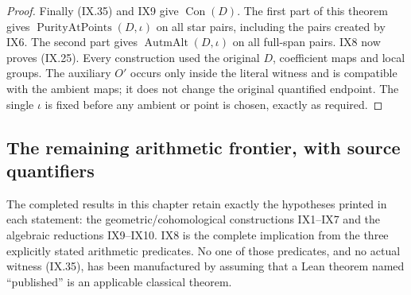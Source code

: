 \begin{proof}
Finally (IX.35) and IX9 give
$\operatorname{Con}(D)$.
The first part of this theorem gives
$\operatorname{PurityAtPoints}(D,\iota)$ on all
star pairs, including the pairs created by IX6.
The second part gives
$\operatorname{AutmAlt}(D,\iota)$ on all full-span
pairs.  IX8 now proves (IX.25).
Every construction used the original $D$, coefficient
maps and local groups.  The auxiliary $O'$ occurs
only inside the literal witness and is compatible
with the ambient maps; it does not change the
original quantified endpoint.
The single $\iota$ is fixed before any ambient or
point is chosen, exactly as required.
\end{proof}

\subsection{The remaining arithmetic frontier, with source quantifiers}

The completed results in this chapter retain exactly
the hypotheses printed in each statement: the
geometric/cohomological constructions IX1--IX7 and
the algebraic reductions IX9--IX10.  IX8 is the
complete implication from the three explicitly
stated arithmetic predicates.  No one of those
predicates, and no actual witness (IX.35), has been
manufactured by assuming that a Lean theorem named
``published'' is an applicable classical theorem.

